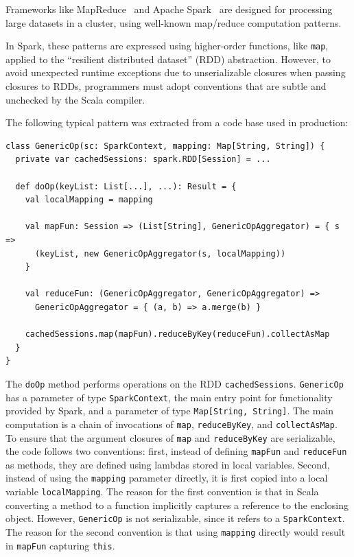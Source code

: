 \documentclass[runningheads]{llncs}
\begin{document}
\begin{sloppypar}

Frameworks like MapReduce~\cite{MapReduce} and Apache Spark~\cite{Spark} are designed for processing large datasets in a cluster,
using well-known map/reduce computation patterns.

In Spark, these patterns are expressed using higher-order functions, like \verb|map|, applied to the ``resilient distributed dataset'' (RDD) abstraction. However, to avoid unexpected runtime exceptions due to unserializable closures when passing closures to RDDs, programmers must adopt conventions that are subtle and unchecked by the Scala compiler.

The following typical pattern was extracted from a code base used in production:

\begin{lstlisting}
class GenericOp(sc: SparkContext, mapping: Map[String, String]) {
  private var cachedSessions: spark.RDD[Session] = ...

  def doOp(keyList: List[...], ...): Result = {
    val localMapping = mapping

    val mapFun: Session => (List[String], GenericOpAggregator) = { s =>
      (keyList, new GenericOpAggregator(s, localMapping))
    }

    val reduceFun: (GenericOpAggregator, GenericOpAggregator) =>
      GenericOpAggregator = { (a, b) => a.merge(b) }

    cachedSessions.map(mapFun).reduceByKey(reduceFun).collectAsMap
  }
}
\end{lstlisting}
\noindent
The \verb|doOp| method performs operations on the RDD \verb|cachedSessions|. \verb|GenericOp| has a parameter of type \verb|SparkContext|, the main entry point for functionality provided by Spark, and a parameter of type \verb|Map[String, String]|. The main computation is a chain of invocations of \verb|map|, \verb|reduceByKey|, and \verb|collectAsMap|. To ensure that the argument closures of \verb|map| and \verb|reduceByKey| are serializable, the code follows two conventions: first, instead of defining \verb|mapFun| and \verb|reduceFun| as methods, they are defined using lambdas stored in local variables. Second, instead of using the \verb|mapping| parameter directly, it is first copied into a local variable \verb|localMapping|. The reason for the first convention is that in Scala converting a method to a function implicitly captures a reference to the enclosing object. However, \verb|GenericOp| is not serializable, since it refers to a \verb|SparkContext|. The reason for the second convention is that using \verb|mapping| directly would result in \verb|mapFun| capturing \verb|this|.


\end{sloppypar}
\end{document}

